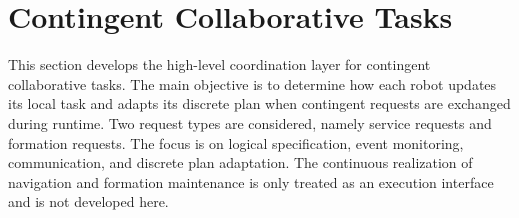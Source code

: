 \section{Contingent Collaborative Tasks}
\label{ch03:sec:contingent_collaborative_tasks}

This section develops the high-level coordination layer for contingent
collaborative tasks. The main objective is to determine how each robot
updates its local task and adapts its discrete plan when contingent
requests are exchanged during runtime. Two request types are considered,
namely service requests and formation requests. The focus is on logical
specification, event monitoring, communication, and discrete plan
adaptation. The continuous realization of navigation and formation
maintenance is only treated as an execution interface and is not
developed here.

